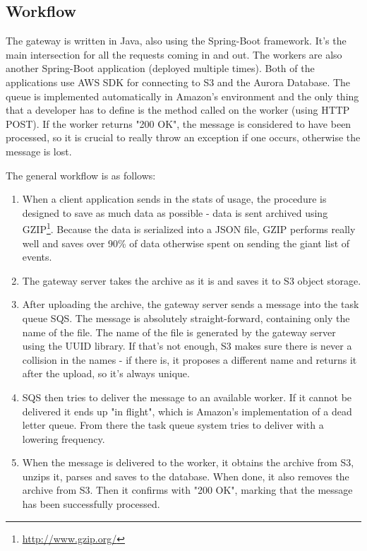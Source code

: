 \subsection{Workflow}

The gateway is written in Java, also using the Spring-Boot framework. It's the main intersection for all the requests coming in and out. The workers are also another Spring-Boot application (deployed multiple times). Both of the applications use AWS SDK for connecting to S3 and the Aurora Database. The queue is implemented automatically in Amazon's environment and the only thing that a developer has to define is the method called on the worker (using HTTP POST). If the worker returns "200 OK", the message is considered to have been processed, so it is crucial to really throw an exception if one occurs, otherwise the message is lost.

\newpage

The general workflow is as follows:

\begin{enumerate}
	\item When a client application sends in the stats of usage, the procedure is designed to save as much data as possible - data is sent archived using GZIP\footnote{\url{http://www.gzip.org/}}. Because the data is serialized into a JSON file, GZIP performs really well and saves over 90\% of data otherwise spent on sending the giant list of events.
	\item The gateway server takes the archive as it is and saves it to S3 object storage.
	\item After uploading the archive, the gateway server sends a message into the task queue SQS. The message is absolutely straight-forward, containing only the name of the file. The name of the file is generated by the gateway server using the UUID library. If that's not enough, S3 makes sure there is never a collision in the names - if there is, it proposes a different name and returns it after the upload, so it's always unique.
	\item SQS then tries to deliver the message to an available worker. If it cannot be delivered it ends up "in flight", which is Amazon's implementation of a dead letter queue. From there the task queue system tries to deliver with a lowering frequency.
	\item When the message is delivered to the worker, it obtains the archive from S3, unzips it, parses and saves to the database. When done, it also removes the archive from S3. Then it confirms with "200 OK", marking that the message has been successfully processed.
\end{enumerate}

